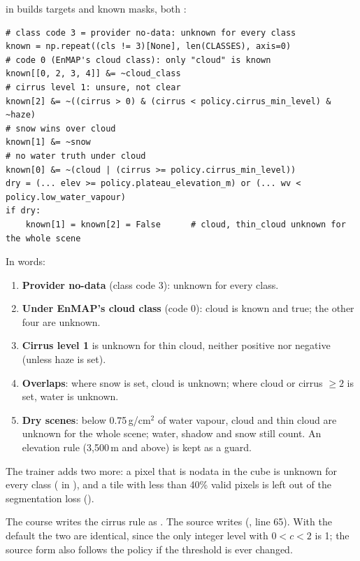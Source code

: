  in  builds targets and known masks, both :
\begin{lstlisting}
# class code 3 = provider no-data: unknown for every class
known = np.repeat((cls != 3)[None], len(CLASSES), axis=0)
# code 0 (EnMAP's cloud class): only "cloud" is known
known[[0, 2, 3, 4]] &= ~cloud_class
# cirrus level 1: unsure, not clear
known[2] &= ~((cirrus > 0) & (cirrus < policy.cirrus_min_level) & ~haze)
# snow wins over cloud
known[1] &= ~snow
# no water truth under cloud
known[0] &= ~(cloud | (cirrus >= policy.cirrus_min_level))
dry = (... elev >= policy.plateau_elevation_m) or (... wv < policy.low_water_vapour)
if dry:
    known[1] = known[2] = False      # cloud, thin_cloud unknown for the whole scene
\end{lstlisting}
In words:
\begin{enumerate}
  \item \textbf{Provider no-data} (class code 3): unknown for every class.
  \item \textbf{Under EnMAP's cloud class} (code 0): cloud is known and true; the other four are unknown.
  \item \textbf{Cirrus level 1} is unknown for thin cloud, neither positive nor negative (unless haze is set).
  \item \textbf{Overlaps}: where snow is set, cloud is unknown; where cloud or cirrus $\ge 2$ is set, water is unknown.
  \item \textbf{Dry scenes}: below 0.75\,g/cm$^2$ of water vapour, cloud and thin cloud are unknown for the whole scene; water, shadow and
    snow still count. An elevation rule (3,500\,m and above) is kept as a guard.
\end{enumerate}
The trainer adds two more: a pixel that is nodata in the cube is unknown for every class ( in
), and a tile with less than 40\% valid pixels is left out of the segmentation loss
().

\begin{sourcenote}
The course writes the cirrus rule as . The source writes
 (, line 65). With the default
 the two are identical, since the only integer level with $0 < c < 2$ is 1; the source form also follows the policy
if the threshold is ever changed.
\end{sourcenote}

